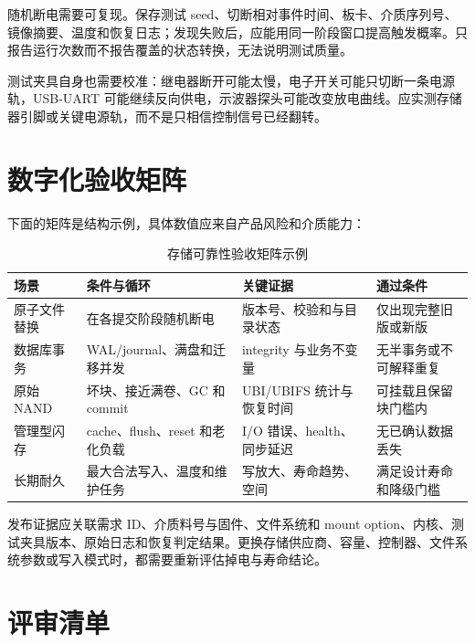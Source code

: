 随机断电需要可复现。保存测试 seed、切断相对事件时间、板卡、介质序列号、镜像摘要、温度和恢复日志；发现失败后，应能用同一阶段窗口提高触发概率。只报告运行次数而不报告覆盖的状态转换，无法说明测试质量。

测试夹具自身也需要校准：继电器断开可能太慢，电子开关可能只切断一条电源轨，USB-UART 可能继续反向供电，示波器探头可能改变放电曲线。应实测存储器引脚或关键电源轨，而不是只相信控制信号已经翻转。

\section{数字化验收矩阵}

下面的矩阵是结构示例，具体数值应来自产品风险和介质能力：

\begin{table}[H]
  \centering
  \caption{存储可靠性验收矩阵示例}
  \begin{tabular}{p{27mm}p{43mm}p{30mm}p{28mm}}
    \hline
    场景 & 条件与循环 & 关键证据 & 通过条件 \\
    \hline
    原子文件替换 & 在各提交阶段随机断电 & 版本号、校验和与目录状态 & 仅出现完整旧版或新版 \\
    数据库事务 & WAL/journal、满盘和迁移并发 & integrity 与业务不变量 & 无半事务或不可解释重复 \\
    原始 NAND & 坏块、接近满卷、GC 和 commit & UBI/UBIFS 统计与恢复时间 & 可挂载且保留块门槛内 \\
    管理型闪存 & cache、flush、reset 和老化负载 & I/O 错误、health、同步延迟 & 无已确认数据丢失 \\
    长期耐久 & 最大合法写入、温度和维护任务 & 写放大、寿命趋势、空间 & 满足设计寿命和降级门槛 \\
    \hline
  \end{tabular}
\end{table}

发布证据应关联需求 ID、介质料号与固件、文件系统和 mount option、内核、测试夹具版本、原始日志和恢复判定结果。更换存储供应商、容量、控制器、文件系统参数或写入模式时，都需要重新评估掉电与寿命结论。

\section{评审清单}

